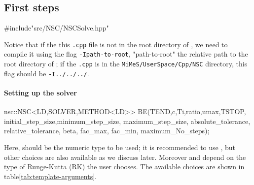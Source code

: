 \documentclass[11pt,a4paper]{article}
\begin{document}
\subsection{First steps}\label{sec:First_examples} 


\begin{cpp}
	#include"src/NSC/NSCSolve.hpp"
\end{cpp}
%
Notice that if the this {\tt .cpp} file is not in the root directory of \nsc, we need to compile it using the flag {\tt -Ipath-to-root}, "path-to-root" the relative path to the root directory of \nsc; \eg if the {\tt .cpp} is in the {\tt MiMeS/UserSpace/Cpp/NSC} directory, this flag should be {\tt -I../../../}.


\paragraph{Setting up the solver}

%
\begin{cpp}
    nsc::NSC<LD,SOLVER,METHOD<LD>> BE(TEND,c,Ti,ratio,umax,TSTOP,
		initial_step_size,minimum_step_size, maximum_step_size, 
		absolute_tolerance, relative_tolerance, beta,
		fac_max, fac_min, maximum_No_steps);
\end{cpp}
%
Here,  should be the numeric type to be used; it is recommended to use , but other choices are also available as we discuss later. Moreover  and  depend on the type of Runge-Kutta (RK) the user chooses. The available choices are shown in table\ref{tab:template-arguments}. 
\end{document}
